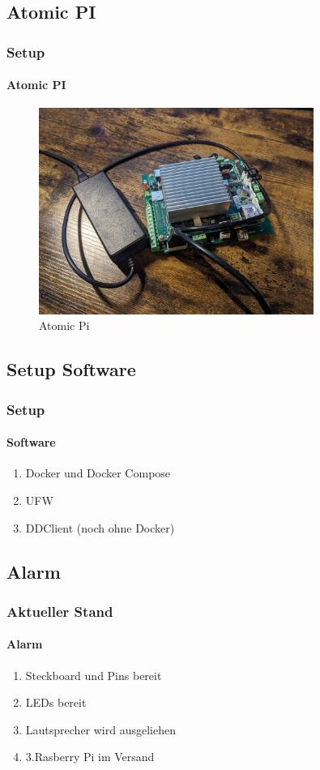 \documentclass[]{beamer}
\begin{document}
\subsection{Atomic PI}
\begin{frame}
	\frametitle{Setup}
	\framesubtitle{Atomic PI}
	\begin{figure}
		\centering
		\begin{minipage}[t]{1\textwidth}
			\centering
			\includegraphics[width=0.8\textwidth]{Images/AtomicPi.jpg}
		\end{minipage}
		\caption{Atomic Pi}
		\label{fig:Atomic Pi}
	\end{figure}
\end{frame}



\subsection{Setup Software}
\begin{frame}
	\frametitle{Setup}
	\framesubtitle{Software}

	\begin{enumerate}
		\item Docker und Docker Compose
		\item UFW
		\item DDClient (noch ohne Docker)
	\end{enumerate}
\end{frame}

\subsection{Alarm}
\begin{frame}
	\frametitle{Aktueller Stand}
	\framesubtitle{Alarm}
	\begin{enumerate}
		\item Steckboard und Pins bereit
		\item LEDs bereit
		\item Lautsprecher wird ausgeliehen
		\item 3.Rasberry Pi im Versand
	\end{enumerate}
\end{frame}
\end{document}
